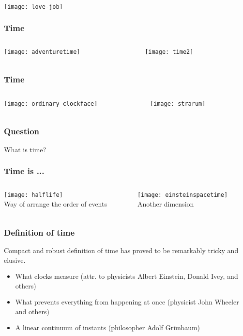 \documentclass[aspectratio=169, 15pt,usenames,dvipsnames]{beamer}
\begin{document}
	\begin{gdblank}
		\centering\texttt{[image: love-job]} 
	\end{gdblank}
	\begin{gdblank}
		\frametitle{Time} 
		\begin{columns}
			\begin{column}{0.5\textwidth}
				\centering\texttt{[image: adventuretime]} 
			\end{column}
			\pause 
			\begin{column}{0.5\textwidth}
				\centering\texttt{[image: time2]} 
			\end{column}
		\end{columns}            
	\end{gdblank}
	\begin{gdblank}
		\frametitle{Time}
		\begin{columns}
			\begin{column}{0.5\textwidth}
				\centering\texttt{[image: ordinary-clockface]} 
			\end{column}
			\pause 
			\begin{column}{0.5\textwidth}
				\centering\texttt{[image: strarum]} 
			\end{column}
		\end{columns}            
	\end{gdblank}
	\begin{gdblank}
		\frametitle{Question}
		\centering\Huge What is time?           
	\end{gdblank} 
	\begin{gdblank}
		\frametitle{Time is ...}
		\begin{columns}
			\begin{column}{0.5\textwidth}
				\centering\texttt{[image: halflife]} 
				\\Way of arrange the order of events 
			\end{column}
			\pause 
			\begin{column}{0.5\textwidth}
				\centering\texttt{[image: einsteinspacetime]} 
				\\Another dimension
			\end{column}
		\end{columns} 
	\end{gdblank} 
	\begin{gdblank}
		\frametitle{Definition of time}
		\LARGE Compact and robust definition of time has proved to be remarkably tricky and elusive.
		\large
		\vskip1cm
		\begin{itemize}
			\item What clocks measure (attr. to physicists Albert Einstein, Donald Ivey, and others)
			\item What prevents everything from happening at once (physicist John Wheeler and others)
			\item A linear continuum of instants (philosopher Adolf Grünbaum)
		\end{itemize}
	\end{gdblank}
\end{document}
